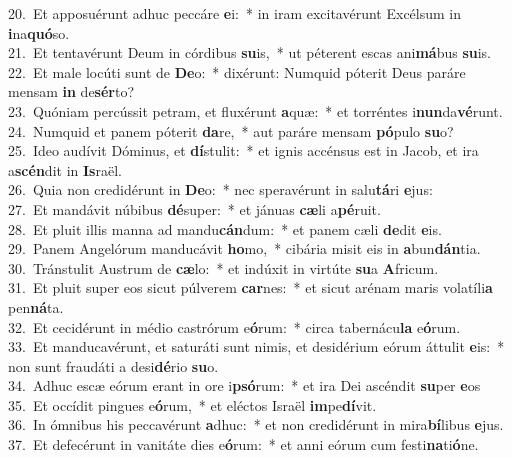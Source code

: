 {20.~}Et apposuérunt adhuc peccáre \textbf{e}i:~* in iram excitavérunt Excélsum in \textbf{i}na\textbf{quó}so.\\
{21.~}Et tentavérunt Deum in córdibus \textbf{su}is,~* ut péterent escas ani\textbf{má}bus \textbf{su}is.\\
{22.~}Et male locúti sunt de \textbf{De}o:~* dixérunt: Numquid póterit Deus paráre mensam \textbf{in} de\textbf{sér}to?\\
{23.~}Quóniam percússit petram, et fluxérunt \textbf{a}quæ:~* et torréntes i\textbf{nun}da\textbf{vé}runt.\\
{24.~}Numquid et panem póterit \textbf{da}re,~* aut paráre mensam \textbf{pó}pulo \textbf{su}o?\\
{25.~}Ideo audívit Dóminus, et \textbf{dí}stulit:~* et ignis accénsus est in Jacob, et ira a\textbf{scén}dit in \textbf{Is}raël.\\
{26.~}Quia non credidérunt in \textbf{De}o:~* nec speravérunt in salu\textbf{tá}ri \textbf{e}jus:\\
{27.~}Et mandávit núbibus \textbf{dé}super:~* et jánuas \textbf{cæ}li a\textbf{pé}ruit.\\
{28.~}Et pluit illis manna ad mandu\textbf{cán}dum:~* et panem cæli \textbf{de}dit \textbf{e}is.\\
{29.~}Panem Angelórum manducávit \textbf{ho}mo,~* cibária misit eis in \textbf{a}bun\textbf{dán}tia.\\
{30.~}Tránstulit Austrum de \textbf{cæ}lo:~* et indúxit in virtúte \textbf{su}a \textbf{A}fricum.\\
{31.~}Et pluit super eos sicut púlverem \textbf{car}nes:~* et sicut arénam maris volatíli\textbf{a} pen\textbf{ná}ta.\\
{32.~}Et cecidérunt in médio castrórum e\textbf{ó}rum:~* circa tabernácu\textbf{la} e\textbf{ó}rum.\\
{33.~}Et manducavérunt, et saturáti sunt nimis, et desidérium eórum áttulit \textbf{e}is:~* non sunt fraudáti a desi\textbf{dé}rio \textbf{su}o.\\
{34.~}Adhuc escæ eórum erant in ore i\textbf{psó}rum:~* et ira Dei ascéndit \textbf{su}per \textbf{e}os\\
{35.~}Et occídit pingues e\textbf{ó}rum,~* et eléctos Israël \textbf{im}pe\textbf{dí}vit.\\
{36.~}In ómnibus his peccavérunt \textbf{a}dhuc:~* et non credidérunt in mira\textbf{bí}libus \textbf{e}jus.\\
{37.~}Et defecérunt in vanitáte dies e\textbf{ó}rum:~* et anni eórum cum festi\textbf{na}ti\textbf{ó}ne.\\
